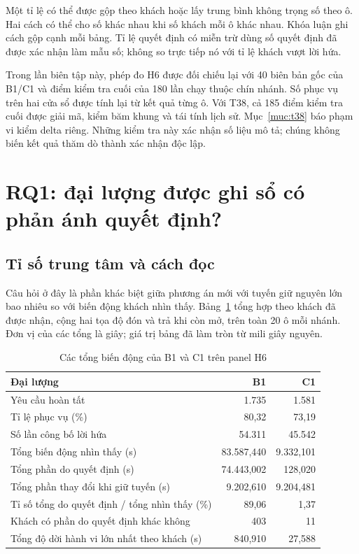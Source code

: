 Một tỉ lệ có thể được gộp theo khách hoặc lấy trung bình không trọng số theo ô. Hai cách
có thể cho số khác nhau khi số khách mỗi ô khác nhau. Khóa luận ghi cách gộp cạnh mỗi bảng.
Tỉ lệ quyết định có miễn trừ dùng số quyết định đã được xác nhận làm mẫu số; không so
trực tiếp nó với tỉ lệ khách vượt lời hứa.

Trong lần biên tập này, phép đo H6 được đối chiếu lại với 40 biên bản gốc của B1/C1 và
điểm kiểm tra cuối của 180 lần chạy thuộc chín nhánh. Số phục vụ trên hai cửa sổ được
tính lại từ kết quả từng ô. Với T38, cả 185 điểm kiểm tra cuối được giải mã, kiểm băm
khung và tái tính lịch sử. Mục~\ref{muc:t38} báo phạm vi kiểm delta riêng. Những kiểm
tra này xác nhận số liệu mô tả; chúng không biến kết quả thăm dò thành xác nhận độc lập.

\section{RQ1: đại lượng được ghi sổ có phản ánh quyết định?}
\label{muc:quytrach}

\subsection{Tỉ số trung tâm và cách đọc}

Câu hỏi ở đây là phần khác biệt giữa phương án mới với tuyến giữ nguyên lớn bao nhiêu so
với biến động khách nhìn thấy. Bảng~\ref{bang:quytrach} tổng hợp theo khách đã được nhận,
cộng hai tọa độ đón và trả khi còn mở, trên toàn 20 ô mỗi nhánh. Đơn vị của các tổng là
giây; giá trị bảng đã làm tròn từ mili giây nguyên.

\begin{table}[htbp]
\centering
\caption{Các tổng biến động của B1 và C1 trên panel H6}
\label{bang:quytrach}
\begin{tabularx}{\linewidth}{@{}Xrr@{}}
\toprule
\textbf{Đại lượng} & \textbf{B1} & \textbf{C1}\\
\midrule
Yêu cầu hoàn tất & 1.735 & 1.581\\
Tỉ lệ phục vụ (\%) & 80,32 & 73,19\\
Số lần công bố lời hứa & 54.311 & 45.542\\
Tổng biến động nhìn thấy (s) & 83.587,440 & 9.332,101\\
Tổng phần do quyết định (s) & 74.443,002 & 128,020\\
Tổng phần thay đổi khi giữ tuyến (s) & 9.202,610 & 9.204,481\\
Tỉ số tổng do quyết định / tổng nhìn thấy (\%) & 89,06 & 1,37\\
Khách có phần do quyết định khác không & 403 & 11\\
Tổng độ dời hành vi lớn nhất theo khách (s) & 840,910 & 27,588\\
\bottomrule
\end{tabularx}
\end{table}


